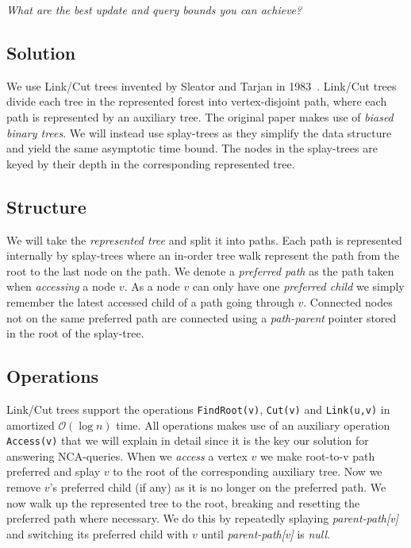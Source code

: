 \documentclass[a4paper,oneside,article,11pt]{memoir}
\begin{document}
\textit{What are the best update and query bounds you can achieve?}

\subsection{Solution}
We use Link/Cut trees invented by Sleator and Tarjan in 1983~\cite{Sleator1983}. Link/Cut trees divide each tree in the represented forest into vertex-disjoint path, where each path is represented by an auxiliary tree. The original paper makes use of \textit{biased binary trees}. We will instead use splay-trees as they simplify the data structure and yield the same asymptotic time bound. The nodes in the splay-trees are keyed by their depth in the corresponding represented tree.

\subsection{Structure}
We will take the \textit{represented tree} and split it into paths. Each path is represented internally by splay-trees where an in-order tree walk represent the path from the root to the last node on the path. We denote a \textit{preferred path} as the path taken when \textit{accessing} a node $v$. As a node $v$ can only have one \textit{preferred child} we simply remember the latest accessed child of a path going through $v$. Connected nodes not on the same preferred path are connected using a \textit{path-parent} pointer stored in the root of the splay-tree.

\subsection{Operations}
Link/Cut trees support the operations \texttt{FindRoot(v)}, \texttt{Cut(v)} and \texttt{Link(u,v)} in amortized $\mathcal{O}(\log n)$ time. All operations makes use of an auxiliary operation \texttt{Access(v)} that we will explain in detail since it is the key our solution for answering NCA-queries. When we \textit{access} a vertex $v$ we make root-to-v path preferred and splay $v$ to the root of the corresponding auxiliary tree. Now we remove $v$'s preferred child (if any) as it is no longer on the preferred path. We now walk up the represented tree to the root, breaking and resetting the preferred path where necessary. We do this by repeatedly splaying \textit{parent-path[v]} and switching its preferred child with $v$ until \textit{parent-path[v]} is \textit{null}.
\end{document}

